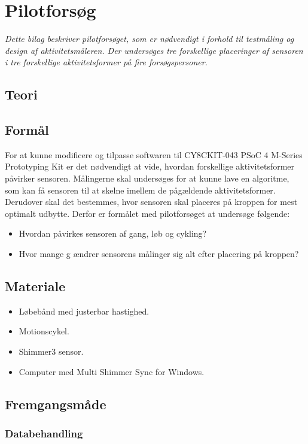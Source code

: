\chapter{Pilotforsøg}
\textit{Dette bilag beskriver pilotforsøget, som er nødvendigt i forhold til testmåling og design af aktivitetsmåleren. Der undersøges tre forskellige placeringer af sensoren i tre forskellige aktivitetsformer på fire forsøgspersoner.}

\section{Teori}

\section{Formål}
For at kunne modificere og tilpasse softwaren til CY8CKIT-043 PSoC 4 M-Series Prototyping Kit er det nødvendigt at vide, hvordan forskellige aktivitetsformer påvirker sensoren. Målingerne skal undersøges for at kunne lave en algoritme, som kan få sensoren til at skelne imellem de pågældende aktivitetsformer. Derudover skal det bestemmes, hvor sensoren skal placeres på kroppen for mest optimalt udbytte. Derfor er formålet med pilotforsøget at undersøge følgende:
\begin{itemize}
	\item Hvordan påvirkes sensoren af gang, løb og cykling? 
	\item Hvor mange g ændrer sensorens målinger sig alt efter placering på kroppen?
\end{itemize}

\section{Materiale}
\begin{itemize}
	\item Løbebånd med justerbar hastighed.
	\item Motionscykel.
	\item Shimmer3 sensor.
	\item Computer med Multi Shimmer Sync for Windows.
\end{itemize}

\section{Fremgangsmåde}

\subsection{Databehandling}

